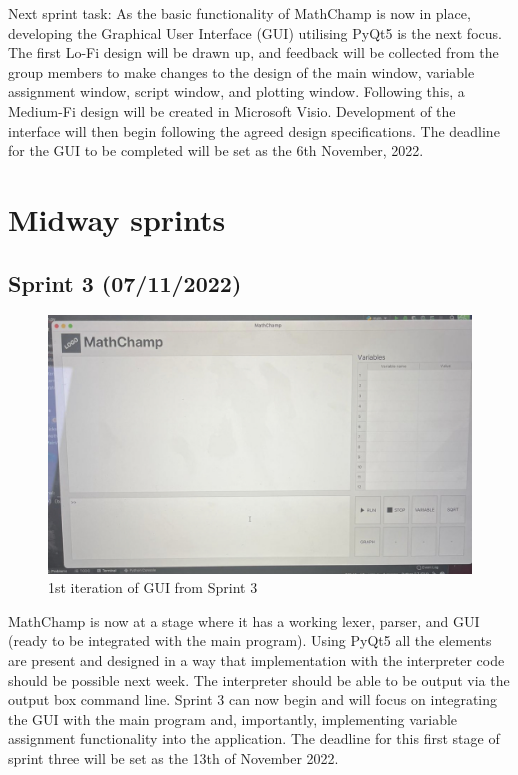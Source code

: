 \documentclass[a4paper, oneside, 11pt]{report}
\begin{document}
Next sprint task:
As the basic functionality of MathChamp is now in place, developing the Graphical User Interface (GUI) utilising PyQt5 is the next focus. The first Lo-Fi design will be drawn up, and feedback will be collected from the group members to make changes to the design of the main window, variable assignment window, script window, and plotting window. Following this, a Medium-Fi design will be created in Microsoft Visio. Development of the interface will then begin following the agreed design specifications. The deadline for the GUI to be completed will be set as the 6th November, 2022.


\section{Midway sprints}
\subsection{Sprint 3 (07/11/2022)}

\begin{figure}[H]
    \centering
    \includegraphics[width=12cm]{1st_screenshot.jpg}
    \caption{1st iteration of GUI from Sprint 3}
    \label{fig:1stGUI}
\end{figure}

MathChamp is now at a stage where it has a working lexer, parser, and GUI (ready to be integrated with the main program). Using PyQt5 all the elements are present and designed in a way that implementation with the interpreter code should be possible next week. The interpreter should be able to be output via the output box command line. Sprint 3 can now begin and will focus on integrating the GUI with the main program and, importantly, implementing variable assignment functionality into the application. The deadline for this first stage of sprint three will be set as the 13th of November 2022. \\
\end{document}
